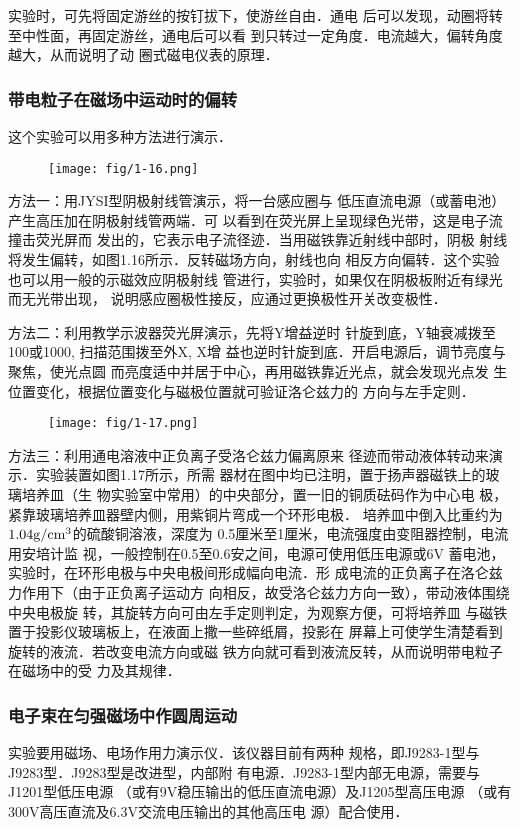 实验时，可先将固定游丝的按钉拔下，使游丝自由．通电
后可以发现，动圈将转至中性面，再固定游丝，通电后可以看
到只转过一定角度．电流越大，偏转角度越大，从而说明了动
圈式磁电仪表的原理．

\subsubsection{带电粒子在磁场中运动时的偏转}
这个实验可以用多种方法进行演示．
\begin{figure}[htp]
    \centering
\texttt{[image: fig/1-16.png]}
    \caption{}
\end{figure}

方法一：用JYSI型阴极射线管演示，将一台感应圈与
低压直流电源（或蓄电池）产生高压加在阴极射线管两端．可
以看到在荧光屏上呈现绿色光带，这是电子流撞击荧光屏而
发出的，它表示电子流径迹．当用磁铁靠近射线中部时，阴极
射线将发生偏转，如图1.16所示．反转磁场方向，射线也向
相反方向偏转．这个实验也可以用一般的示磁效应阴极射线
管进行，实验时，如果仅在阴极板附近有绿光而无光带出现，
说明感应圈极性接反，应通过更换极性开关改变极性．

方法二：利用教学示波器荧光屏演示，先将Y增益逆时
针旋到底，Y轴衰减拨至100或1000, 扫描范围拨至外X, X增
益也逆时针旋到底．开启电源后，调节亮度与聚焦，使光点圆
而亮度适中并居于中心，再用磁铁靠近光点，就会发现光点发
生位置变化，根据位置变化与磁极位置就可验证洛仑兹力的
方向与左手定则．
\begin{figure}[htp]
    \centering
\texttt{[image: fig/1-17.png]}
    \caption{}
\end{figure}

方法三：利用通电溶液中正负离子受洛仑兹力偏离原来
径迹而带动液体转动来演示．实验装置如图1.17所示，所需
器材在图中均已注明，置于扬声器磁铁上的玻璃培养皿（生
物实验室中常用）的中央部分，置一旧的铜质砝码作为中心电
极，紧靠玻璃培养皿器壁内侧，用紫铜片弯成一个环形电极．
培养皿中倒入比重约为$1.04{\rm g/cm^3}$的硫酸铜溶液，深度为
0.5厘米至1厘米，电流强度由变阻器控制，电流用安培计监
视，一般控制在0.5至0.6安之间，电源可使用低压电源或6V
蓄电池，实验时，在环形电极与中央电极间形成幅向电流．形
成电流的正负离子在洛仑兹力作用下（由于正负离子运动方
向相反，故受洛仑兹力方向一致），带动液体围绕中央电极旋
转，其旋转方向可由左手定则判定，为观察方便，可将培养皿
与磁铁置于投影仪玻璃板上，在液面上撒一些碎纸屑，投影在
屏幕上可使学生清楚看到旋转的液流．若改变电流方向或磁
铁方向就可看到液流反转，从而说明带电粒子在磁场中的受
力及其规律．

\subsubsection{电子束在匀强磁场中作圆周运动}
实验要用磁场、电场作用力演示仪．该仪器目前有两种
规格，即J9283-1型与J9283型．J9283型是改进型，内部附
有电源．J9283-1型内部无电源，需要与J1201型低压电源
（或有9V稳压输出的低压直流电源）及J1205型高压电源
（或有300V高压直流及6.3V交流电压输出的其他高压电
源）配合使用．

